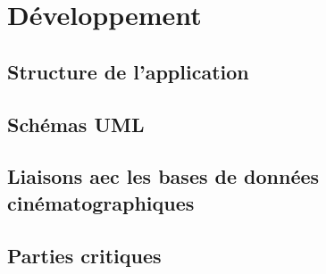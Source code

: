 \chapter{Développement}

\section{Structure de l'application}

\section{Schémas UML} %

\section{Liaisons aec les bases de données cinématographiques}

\section{Parties critiques}
